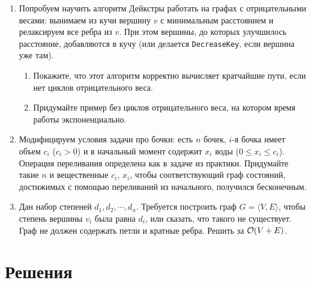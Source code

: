 \begin{enumerate}
  \item
    Попробуем научить алгоритм Дейкстры работать на графах с отрицательными весами: вынимаем из кучи вершину $v$
    с минимальным расстоянием и релаксируем все ребра из $v$. При этом вершины, до которых улучшилось расстояние,
    добавляются в кучу (или делается \texttt{DecreaseKey}, если вершина уже там).
    \begin{enumerate}
      \item Покажите, что этот алгоритм корректно вычисляет кратчайшие пути, если нет циклов отрицательного веса.
      \item Придумайте пример без циклов отрицательного веса, на котором время работы экспоненциально.
    \end{enumerate}

  \item
    Модифицируем условия задачи про бочки: есть $n$ бочек, $i$-я бочка имеет
    объем $c_i$ ($c_i > 0$) и в начальный момент содержит $x_i$ воды
    ($0 \le x_i \le c_i$). Операция переливания определена как в задаче из практики.
    Придумайте такие $n$ и вещественные $c_i$, $x_i$, чтобы соответствующий граф
    состояний, достижимых с помощью переливаний из начального, получился бесконечным.

  \item
    Дан набор степеней $d_1, d_2, \cdots, d_n$. Требуется
    построить граф $G = \langle V, E \rangle$, чтобы степень вершины
    $v_i$ была равна $d_i$, или сказать, что такого не существует.
    Граф не должен содержать петли и кратные ребра. Решить за $\mathcal{O}(V + E)$.

\end{enumerate}

\pagebreak

\section{Решения}

